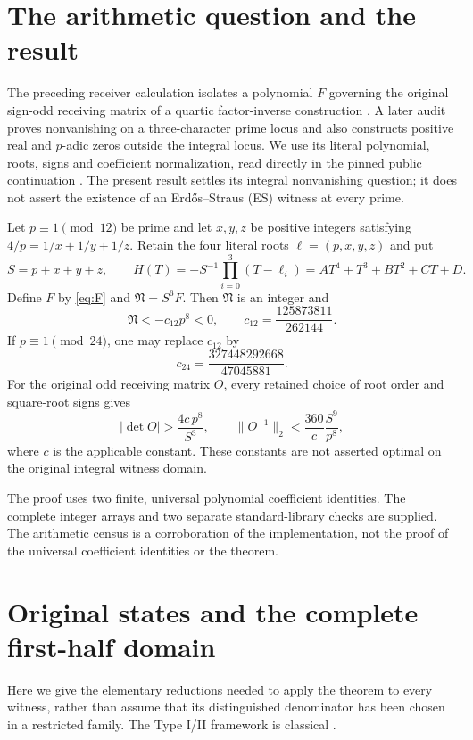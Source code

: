 \section{The arithmetic question and the result}
The preceding receiver calculation isolates a polynomial $F$ governing the
original sign-odd receiving matrix of a quartic factor-inverse construction
\cite[EZ37--EZ45]{Receiver}. A later audit proves nonvanishing on a
three-character prime locus and also constructs positive real and $p$-adic
zeros outside the integral locus. We use its literal polynomial, roots, signs
and coefficient normalization, read directly in the pinned public continuation
\cite[Track I, E1--E6]{Frame}. The present
result settles its integral nonvanishing question; it does not assert the
existence of an Erd\H{o}s--Straus (ES) witness at every prime.

\begin{theorem}\label{thm:main}
Let $p\equiv1\pmod{12}$ be prime and let $x,y,z$ be positive integers satisfying
$4/p=1/x+1/y+1/z$. Retain the four literal roots
$\ell=(p,x,y,z)$ and put
\[
 S=p+x+y+z,\qquad
 H(T)=-S^{-1}\prod_{i=0}^3(T-\ell_i)=AT^4+T^3+BT^2+CT+D.
\]
Define $F$ by \eqref{eq:F} and $\mathfrak N=S^6F$. Then $\mathfrak N$ is an
integer and
\begin{equation}\label{eq:main}
 \boxed{\mathfrak N<-c_{12}p^8<0,\qquad
 c_{12}=\frac{125873811}{262144}.}
\end{equation}
If $p\equiv1\pmod{24}$, one may replace $c_{12}$ by
\begin{equation}\label{eq:c24}
 \boxed{c_{24}=\frac{327448292668}{47045881}.}
\end{equation}
For the original odd receiving matrix $O$, every retained choice of root order
and square-root signs gives
\[
 |\det O|>\frac{4c\,p^8}{S^3},\qquad
 \|O^{-1}\|_2<\frac{360}{c}\frac{S^9}{p^8},
\]
where $c$ is the applicable constant. These constants are not asserted optimal
on the original integral witness domain.
\end{theorem}
The proof uses two finite, universal polynomial coefficient identities. The
complete integer arrays and two separate standard-library checks are supplied.
The arithmetic census is a corroboration of the implementation, not the
proof of the universal coefficient identities or the theorem.

\section{Original states and the complete first-half domain}
Here we give the elementary reductions needed to apply the theorem to every
witness, rather than assume that its distinguished denominator has been chosen
in a restricted family. The Type I/II framework is classical
\cite[\S2, Propositions 2.2 and 2.6]{ET}.

